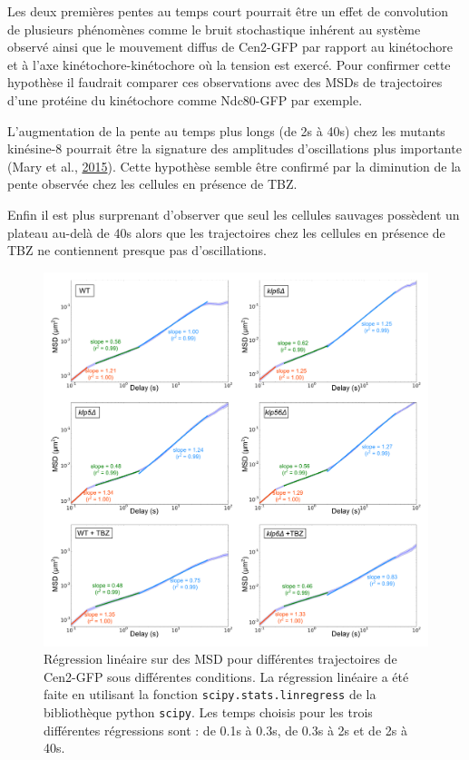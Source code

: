 \documentclass[12pt,a4paper,twoside,openright]{book}
\begin{document}
Les deux premières pentes au temps court pourrait être un effet de
convolution de plusieurs phénomènes comme le bruit stochastique inhérent
au système observé ainsi que le mouvement diffus de Cen2-GFP par rapport
au kinétochore et à l'axe kinétochore-kinétochore où la tension est
exercé. Pour confirmer cette hypothèse il faudrait comparer ces
observations avec des MSDs de trajectoires d'une protéine du kinétochore
comme Ndc80-GFP par exemple.

L'augmentation de la pente au temps plus longs (de 2s à 40s) chez les
mutants kinésine-8 pourrait être la signature des amplitudes
d'oscillations plus importante (Mary et al.,
\protect\hyperlink{ref-Mary2015}{2015}). Cette hypothèse semble être
confirmé par la diminution de la pente observée chez les cellules en
présence de TBZ.

Enfin il est plus surprenant d'observer que seul les cellules sauvages
possèdent un plateau au-delà de 40s alors que les trajectoires chez les
cellules en présence de TBZ ne contiennent presque pas d'oscillations.

\begin{figure}[htbp]
\centering
\includegraphics{figures/results/imaging/msds_log_fit.png}
\caption[Régression linéaire sur des MSD pour différentes trajectoires de Cen2-GFP sous différentes conditions]{\label{fig:msds-log-fit}Régression
linéaire sur des MSD pour différentes trajectoires de Cen2-GFP sous
différentes conditions. La régression linéaire a été faite en utilisant
la fonction \texttt{scipy.stats.linregress} de la bibliothèque python
\texttt{scipy}. Les temps choisis pour les trois différentes régressions
sont : de 0.1s à 0.3s, de 0.3s à 2s et de 2s à 40s.}
\end{figure}
\end{document}
